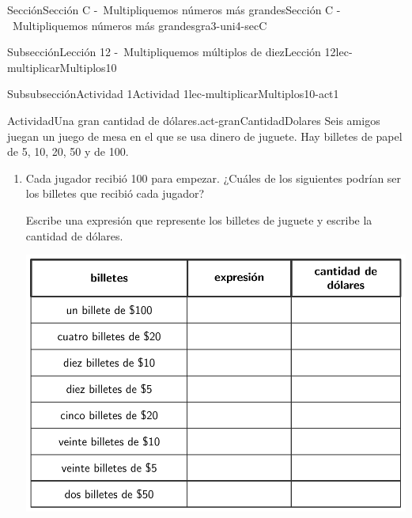 \begin{sectionptx}{Sección}{Sección C -~Multipliquemos números más grandes}{}{Sección C -~Multipliquemos números más grandes}{}{}{gra3-uni4-secC}
%
%
\typeout{************************************************}
\typeout{************************************************}
%
\begin{subsectionptx}{Subsección}{Lección 12 -~Multipliquemos múltiplos de diez}{}{Lección 12}{}{}{lec-multiplicarMultiplos10}
%
%
\typeout{************************************************}
\typeout{************************************************}
%
\clearpage
\begin{subsubsectionptx}{Subsubsección}{Actividad 1}{}{Actividad 1}{}{}{lec-multiplicarMultiplos10-act1}
\begin{activity}{Actividad}{Una gran cantidad de dólares.}{act-granCantidadDolares}%
Seis amigos juegan un juego de mesa en el que se usa dinero de juguete. Hay billetes de papel de \textdollar{}5, \textdollar{}10, \textdollar{}20, \textdollar{}50 y de \textdollar{}100.%
%
\begin{enumerate}
\item{}Cada jugador recibió \textdollar{}100 para empezar. ¿Cuáles de los siguientes podrían ser los billetes que recibió cada jugador?%
\par
Escribe una expresión que represente los billetes de juguete y escribe la cantidad de dólares.%
\begin{image}{0}{1}{0}{}%
\includegraphics[max width=\linewidth, center]{external/tikz-source/unaGranCantidadDeDolares-tab1.pdf}
\end{image}%

\end{enumerate}
\end{activity}
\end{subsubsectionptx}
\end{subsectionptx}
\end{sectionptx}
